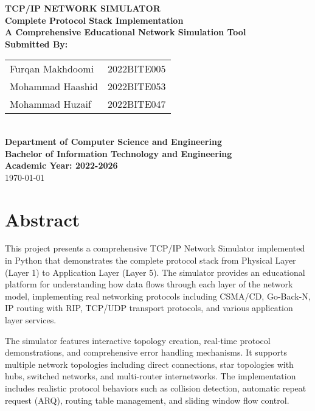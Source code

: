 \documentclass[12pt,a4paper]{article}
\begin{document}
\begin{titlepage}
\centering
\vspace*{2cm}

{\LARGE \textbf{TCP/IP NETWORK SIMULATOR}}\\[0.5cm]
{\Large \textbf{Complete Protocol Stack Implementation}}\\[1.5cm]

{\large \textbf{A Comprehensive Educational Network Simulation Tool}}\\[2cm]

\textbf{Submitted By:}\\[0.5cm]
\begin{tabular}{ll}
Furqan Makhdoomi & 2022BITE005 \\
Mohammad Haashid & 2022BITE053 \\
Mohammad Huzaif & 2022BITE047 \\
\end{tabular}\\[2cm]

\textbf{Department of Computer Science and Engineering}\\
\textbf{Bachelor of Information Technology and Engineering}\\[1cm]

\textbf{Academic Year: 2022-2026}\\[2cm]

\vfill
{\large \today}
\end{titlepage}

\tableofcontents
\newpage

\section{Abstract}

This project presents a comprehensive TCP/IP Network Simulator implemented in Python that demonstrates the complete protocol stack from Physical Layer (Layer 1) to Application Layer (Layer 5). The simulator provides an educational platform for understanding how data flows through each layer of the network model, implementing real networking protocols including CSMA/CD, Go-Back-N, IP routing with RIP, TCP/UDP transport protocols, and various application layer services.

The simulator features interactive topology creation, real-time protocol demonstrations, and comprehensive error handling mechanisms. It supports multiple network topologies including direct connections, star topologies with hubs, switched networks, and multi-router internetworks. The implementation includes realistic protocol behaviors such as collision detection, automatic repeat request (ARQ), routing table management, and sliding window flow control.
\end{document}
